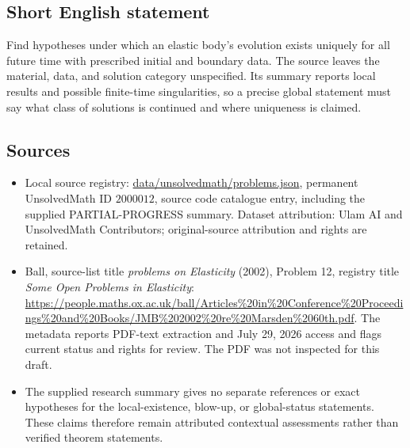 \documentclass[11pt]{article}
\begin{document}
\subsection{Short English statement}
Find hypotheses under which an elastic body's evolution exists uniquely for all future time with prescribed initial and boundary data. The source leaves the material, data, and solution category unspecified. Its summary reports local results and possible finite-time singularities, so a precise global statement must say what class of solutions is continued and where uniqueness is claimed.
\subsection{Sources}
\begin{itemize}
\item Local source registry: \url{data/unsolvedmath/problems.json}, permanent UnsolvedMath ID $2000012$, source code catalogue entry, including the supplied PARTIAL-PROGRESS summary. Dataset attribution: Ulam AI and UnsolvedMath Contributors; original-source attribution and rights are retained.
\item Ball, source-list title \emph{problems on Elasticity} (2002), Problem 12, registry title \emph{Some Open Problems in Elasticity}: \url{https://people.maths.ox.ac.uk/ball/Articles%20in%20Conference%20Proceedings%20and%20Books/JMB%202002%20re%20Marsden%2060th.pdf}. The metadata reports PDF-text extraction and July 29, 2026 access and flags current status and rights for review. The PDF was not inspected for this draft.
\item The supplied research summary gives no separate references or exact hypotheses for the local-existence, blow-up, or global-status statements. These claims therefore remain attributed contextual assessments rather than verified theorem statements.
\end{itemize}
\end{document}
